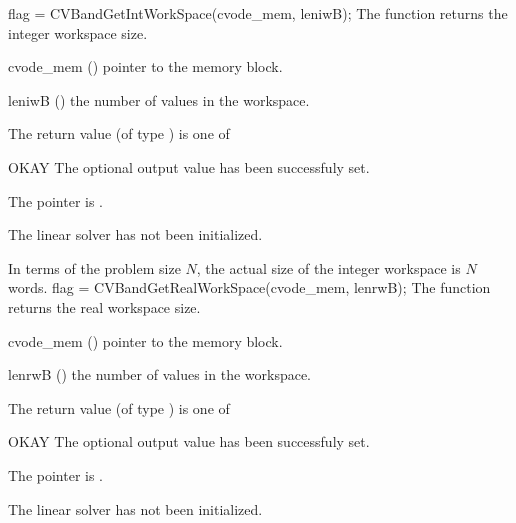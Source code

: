 %
%
{
  flag = CVBandGetIntWorkSpace(cvode\_mem, leniwB);
}
{
  The function  returns the
  {\cvband} integer workspace size.
}
{
  \begin{args}
  \item[cvode\_mem] ()
    pointer to the {\cvode} memory block.
  \item[leniwB] ()
    the number of  values in the {\cvband} workspace.
  \end{args}
}
{
  The return value  (of type ) is one of
  \begin{args}
  \item[OKAY] 
    The optional output value has been successfuly set.
  \item[\Id{LIN\_NO\_MEM}]
    The  pointer is .
  \item[\Id{LIN\_NO\_LMEM}]
    The {\cvband} linear solver has not been initialized.
  \end{args}
}
{
  In terms of the problem size $N$, the actual size of the integer workspace
  is $N$  words.
}
{
  flag = CVBandGetRealWorkSpace(cvode\_mem, lenrwB);
}
{
  The function  returns the
  {\cvband} real workspace size.
}
{
  \begin{args}
  \item[cvode\_mem] ()
    pointer to the {\cvode} memory block.
  \item[lenrwB] ()
    the number of  values in the {\cvband} workspace.
  \end{args}
}
{
  The return value  (of type ) is one of
  \begin{args}
  \item[OKAY] 
    The optional output value has been successfuly set.
  \item[\Id{LIN\_NO\_MEM}]
    The  pointer is .
  \item[\Id{LIN\_NO\_LMEM}]
    The {\cvband} linear solver has not been initialized.
  \end{args}
}
